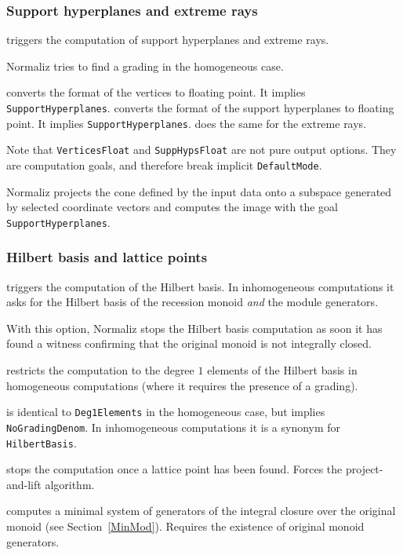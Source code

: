 \subsubsection{Support hyperplanes and extreme rays}

\begin{itemize}
	\itemtt[SupportHyperplanes, -s] triggers the computation of support hyperplanes and extreme rays.
\end{itemize}

Normaliz tries to find a grading in the homogeneous case.

\begin{itemize}
	\itemtt[VerticesFloat] converts the format of the vertices to floating point. It implies \texttt{SupportHyperplanes}.
	\itemtt[SuppHypsFloat] converts the format of the support hyperplanes to floating point. It implies \texttt{SupportHyperplanes}.
	\itemtt[ExtremeRaysFloat] does the same for the extreme rays.
\end{itemize}

Note that \texttt{VerticesFloat} and \texttt{SuppHypsFloat} are not pure output options. They are computation goals, and therefore break implicit \texttt{DefaultMode}.

\begin{itemize}
	\itemtt[ProjectCone] Normaliz projects the cone defined by the input data onto a subspace generated by selected coordinate vectors and computes the image with the goal \verb|SupportHyperplanes|.
\end{itemize}


\subsubsection{Hilbert basis and lattice points}

\begin{itemize}
	
	\itemtt[HilbertBasis, -N] triggers the computation of the Hilbert basis. In inhomogeneous computations it asks for the Hilbert basis of the recession monoid \emph{and} the module generators.
	
	\itemtt [WitnessNotIntegrallyClosed, -w] With this option, Normaliz stops the Hilbert basis computation as soon it has found a witness confirming that the original monoid is not integrally closed.
	
	 restricts the computation to the degree $1$ elements of the Hilbert basis in homogeneous computations (where it requires the presence of a grading).
	
	\itemtt[LatticePoints] is identical to \verb|Deg1Elements| in the homogeneous case, but implies \verb|NoGradingDenom|. In inhomogeneous computations it is a synonym for \verb|HilbertBasis|.
	
	\itemtt[SingleLatticePoint] stops the computation once a lattice point has been found. Forces the project-and-lift algorithm.
	
	\itemtt[ModuleGeneratorsOverOriginalMonoid, -M] computes a minimal system of generators of the integral closure over the original monoid (see Section~\ref{MinMod}). Requires the existence of original monoid generators.
\end{itemize}

